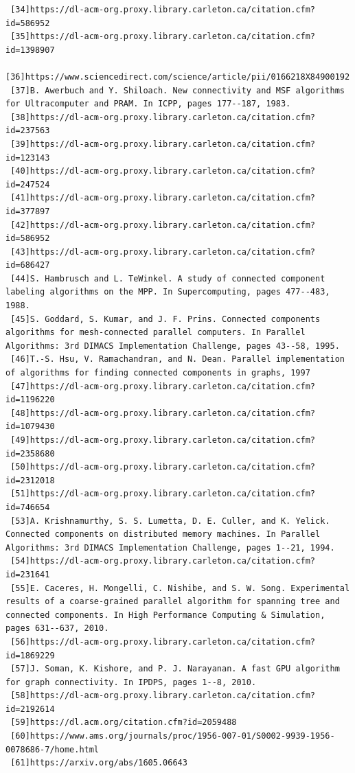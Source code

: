 \documentclass[]{article}
\begin{document}
\begin{verbatim}
 [34]https://dl-acm-org.proxy.library.carleton.ca/citation.cfm?id=586952
 [35]https://dl-acm-org.proxy.library.carleton.ca/citation.cfm?id=1398907
 [36]https://www.sciencedirect.com/science/article/pii/0166218X84900192
 [37]B. Awerbuch and Y. Shiloach. New connectivity and MSF algorithms for Ultracomputer and PRAM. In ICPP, pages 177--187, 1983.
 [38]https://dl-acm-org.proxy.library.carleton.ca/citation.cfm?id=237563
 [39]https://dl-acm-org.proxy.library.carleton.ca/citation.cfm?id=123143
 [40]https://dl-acm-org.proxy.library.carleton.ca/citation.cfm?id=247524
 [41]https://dl-acm-org.proxy.library.carleton.ca/citation.cfm?id=377897
 [42]https://dl-acm-org.proxy.library.carleton.ca/citation.cfm?id=586952
 [43]https://dl-acm-org.proxy.library.carleton.ca/citation.cfm?id=686427
 [44]S. Hambrusch and L. TeWinkel. A study of connected component labeling algorithms on the MPP. In Supercomputing, pages 477--483, 1988.
 [45]S. Goddard, S. Kumar, and J. F. Prins. Connected components algorithms for mesh-connected parallel computers. In Parallel Algorithms: 3rd DIMACS Implementation Challenge, pages 43--58, 1995.
 [46]T.-S. Hsu, V. Ramachandran, and N. Dean. Parallel implementation of algorithms for finding connected components in graphs, 1997
 [47]https://dl-acm-org.proxy.library.carleton.ca/citation.cfm?id=1196220
 [48]https://dl-acm-org.proxy.library.carleton.ca/citation.cfm?id=1079430
 [49]https://dl-acm-org.proxy.library.carleton.ca/citation.cfm?id=2358680
 [50]https://dl-acm-org.proxy.library.carleton.ca/citation.cfm?id=2312018
 [51]https://dl-acm-org.proxy.library.carleton.ca/citation.cfm?id=746654
 [53]A. Krishnamurthy, S. S. Lumetta, D. E. Culler, and K. Yelick. Connected components on distributed memory machines. In Parallel Algorithms: 3rd DIMACS Implementation Challenge, pages 1--21, 1994.
 [54]https://dl-acm-org.proxy.library.carleton.ca/citation.cfm?id=231641
 [55]E. Caceres, H. Mongelli, C. Nishibe, and S. W. Song. Experimental results of a coarse-grained parallel algorithm for spanning tree and connected components. In High Performance Computing & Simulation, pages 631--637, 2010.
 [56]https://dl-acm-org.proxy.library.carleton.ca/citation.cfm?id=1869229
 [57]J. Soman, K. Kishore, and P. J. Narayanan. A fast GPU algorithm for graph connectivity. In IPDPS, pages 1--8, 2010.
 [58]https://dl-acm-org.proxy.library.carleton.ca/citation.cfm?id=2192614
 [59]https://dl.acm.org/citation.cfm?id=2059488
 [60]https://www.ams.org/journals/proc/1956-007-01/S0002-9939-1956-0078686-7/home.html
 [61]https://arxiv.org/abs/1605.06643
  \end{verbatim}
\end{document}
